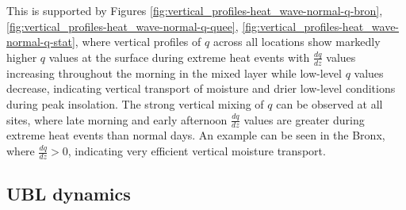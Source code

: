 \documentclass[num-refs]{wiley-article}
\begin{document}
\\ \\
This is supported by Figures \ref{fig:vertical_profiles-heat_wave-normal-q-bron}, \ref{fig:vertical_profiles-heat_wave-normal-q-quee}, \ref{fig:vertical_profiles-heat_wave-normal-q-stat}, where vertical profiles of $q$ across all locations show markedly higher $q$ values at the surface during extreme heat events with $\frac{dq}{dz}$ values increasing throughout the morning in the mixed layer while low-level $q$ values decrease, indicating vertical transport of moisture and drier low-level conditions during peak insolation. The strong vertical mixing of $q$ can be observed at all sites, where late morning and early afternoon $\frac{dq}{dz}$ values are greater during extreme heat events than normal days. An example can be seen in the Bronx, where $\frac{dq}{dz} > 0$, indicating very efficient vertical moisture transport.

\subsection{UBL dynamics}
\end{document}
